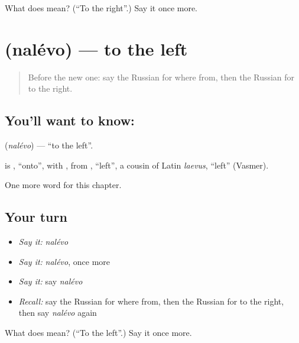 \begin{tcolorbox}[breakable,colback=teal!4,colframe=teal!35!black,title={Before you move on}]
What does  mean? (\textquotedblleft{}To the right\textquotedblright{}.) Say it once more.
\end{tcolorbox}
\section[\texorpdfstring{\ru{налево} (nalévo)}{налево (nalévo)}]{ (nalévo) — to the left}

\label{lesson:RU-C86-to-the-left}



\begin{quote}
Before the new one: say the Russian for where from, then the Russian for to the right.
\end{quote}

\subsection*{You'll want to know: }
\textbf{} (\emph{nalévo}) — \textquotedblleft{}to the left\textquotedblright{}.

\begin{cousinweb}
\textbf{} is \emph{}, \textquotedblleft{}onto\textquotedblright{}, with \emph{}, from \emph{}, \textquotedblleft{}left\textquotedblright{}, a cousin of Latin \emph{laevus}, \textquotedblleft{}left\textquotedblright{} (Vasmer).
\end{cousinweb}

\begin{grammarlens}[title={What you've built}]
One more word for this chapter.
\end{grammarlens}

\subsection*{Your turn}
\begin{itemize}
\raggedright
  \item \emph{Say it:} \emph{nalévo}
  \item \emph{Say it:} \emph{nalévo}, once more
  \item \emph{Say it:} say \emph{nalévo}
  \item \emph{Recall:} say the Russian for where from, then the Russian for to the right, then say \emph{nalévo} again
\end{itemize}

\begin{tcolorbox}[breakable,colback=teal!4,colframe=teal!35!black,title={Before you move on}]
What does  mean? (\textquotedblleft{}To the left\textquotedblright{}.) Say it once more.
\end{tcolorbox}
